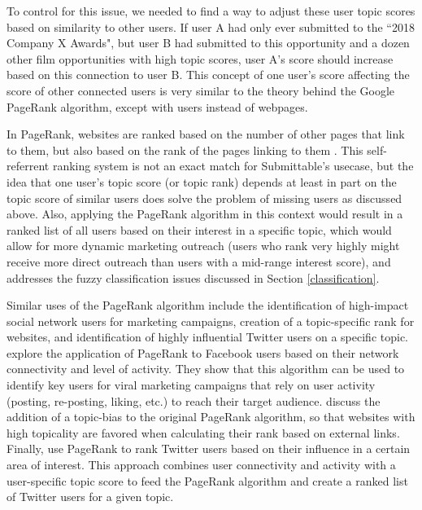 \documentclass[12pt]{report}   %
\begin{document}
To control for this issue, we needed to find a way to adjust these user topic scores based on similarity to other users. If user A had only ever submitted to the ``2018 Company X Awards", but user B had submitted to this opportunity and a dozen other film opportunities with high topic scores, user A's score should increase based on this connection to user B. This concept of one user's score affecting the score of other connected users is very similar to the theory behind the Google PageRank algorithm, except with users instead of webpages. 

In PageRank, websites are ranked based on the number of other pages that link to them, but also based on the rank of the pages linking to them \cite{page_brin_motwani_winograd_1999}. This self-referrent ranking system is not an exact match for Submittable's usecase, but the idea that one user's topic score (or topic rank) depends at least in part on the topic score of similar users does solve the problem of missing users as discussed above. Also, applying the PageRank algorithm in this context would result in a ranked list of all users based on their interest in a specific topic, which would allow for more dynamic marketing outreach (users who rank very highly might receive more direct outreach than users with a mid-range interest score), and addresses the fuzzy classification issues discussed in Section \ref{classification}.

Similar uses of the PageRank algorithm include the identification of high-impact social network users for marketing campaigns, creation of a topic-specific rank for websites, and identification of highly influential Twitter users on a specific topic.  explore the application of PageRank to Facebook users based on their network connectivity and level of activity. They show that this algorithm can be used to identify key users for viral marketing campaigns that rely on user activity (posting, re-posting, liking, etc.) to reach their target audience.   discuss the addition of a topic-bias to the original PageRank algorithm, so that websites with high topicality are favored when calculating their rank based on external links. Finally,  use PageRank to rank Twitter users based on their influence in a certain area of interest. This approach combines user connectivity and activity with a user-specific topic score to feed the PageRank algorithm and create a ranked list of Twitter users for a given topic.
\end{document}
